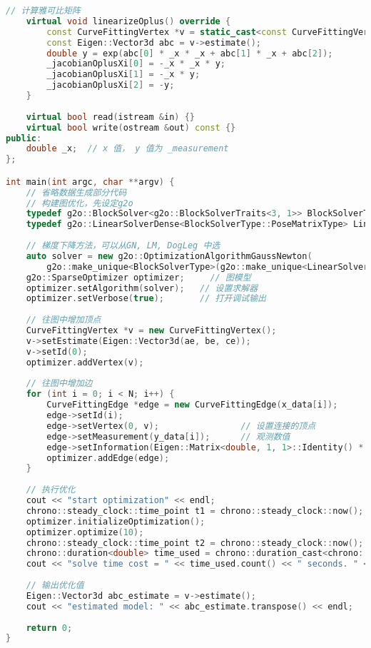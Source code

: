 \begin{lstlisting}[language=c++,caption=slambook/ch6/g2oCurveFitting.cpp]
    // 计算雅可比矩阵
    virtual void linearizeOplus() override {
        const CurveFittingVertex *v = static_cast<const CurveFittingVertex *> (_vertices[0]);
        const Eigen::Vector3d abc = v->estimate();
        double y = exp(abc[0] * _x * _x + abc[1] * _x + abc[2]);
        _jacobianOplusXi[0] = -_x * _x * y;
        _jacobianOplusXi[1] = -_x * y;
        _jacobianOplusXi[2] = -y;
    }
    
    virtual bool read(istream &in) {}
    virtual bool write(ostream &out) const {}
public:
    double _x;  // x 值， y 值为 _measurement
};

int main(int argc, char **argv) {
    // 省略数据生成部分代码
    // 构建图优化，先设定g2o
    typedef g2o::BlockSolver<g2o::BlockSolverTraits<3, 1>> BlockSolverType;  // 每个误差项优化变量维度为3，误差值维度为1
    typedef g2o::LinearSolverDense<BlockSolverType::PoseMatrixType> LinearSolverType; // 线性求解器类型
    
    // 梯度下降方法，可以从GN, LM, DogLeg 中选
    auto solver = new g2o::OptimizationAlgorithmGaussNewton(
        g2o::make_unique<BlockSolverType>(g2o::make_unique<LinearSolverType>()));
    g2o::SparseOptimizer optimizer;     // 图模型
    optimizer.setAlgorithm(solver);   // 设置求解器
    optimizer.setVerbose(true);       // 打开调试输出
    
    // 往图中增加顶点
    CurveFittingVertex *v = new CurveFittingVertex();
    v->setEstimate(Eigen::Vector3d(ae, be, ce));
    v->setId(0);
    optimizer.addVertex(v);
    
    // 往图中增加边
    for (int i = 0; i < N; i++) {
        CurveFittingEdge *edge = new CurveFittingEdge(x_data[i]);
        edge->setId(i);
        edge->setVertex(0, v);                // 设置连接的顶点
        edge->setMeasurement(y_data[i]);      // 观测数值
        edge->setInformation(Eigen::Matrix<double, 1, 1>::Identity() * 1 / (w_sigma * w_sigma)); // 信息矩阵：协方差矩阵之逆
        optimizer.addEdge(edge);
    }
    
    // 执行优化
    cout << "start optimization" << endl;
    chrono::steady_clock::time_point t1 = chrono::steady_clock::now();
    optimizer.initializeOptimization();
    optimizer.optimize(10);
    chrono::steady_clock::time_point t2 = chrono::steady_clock::now();
    chrono::duration<double> time_used = chrono::duration_cast<chrono::duration<double>>(t2 - t1);
    cout << "solve time cost = " << time_used.count() << " seconds. " << endl;
    
    // 输出优化值
    Eigen::Vector3d abc_estimate = v->estimate();
    cout << "estimated model: " << abc_estimate.transpose() << endl;
    
    return 0;
}
\end{lstlisting}

